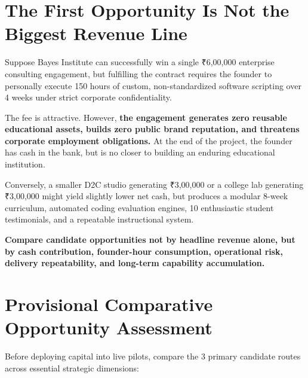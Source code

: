 \section{The First Opportunity Is Not the Biggest Revenue Line}

Suppose Bayes Institute can successfully win a single ₹6,00,000 enterprise consulting engagement, but fulfilling the contract requires the founder to personally execute 150 hours of custom, non-standardized software scripting over 4 weeks under strict corporate confidentiality.

The fee is attractive. However, \textbf{the engagement generates zero reusable educational assets, builds zero public brand reputation, and threatens corporate employment obligations.} At the end of the project, the founder has cash in the bank, but is no closer to building an enduring educational institution.

Conversely, a smaller D2C studio generating ₹3,00,000 or a college lab generating ₹3,00,000 might yield slightly lower net cash, but produces a modular 8-week curriculum, automated coding evaluation engines, 10 enthusiastic student testimonials, and a repeatable instructional system.

\textbf{Compare candidate opportunities not by headline revenue alone, but by cash contribution, founder-hour consumption, operational risk, delivery repeatability, and long-term capability accumulation.}

\section{Provisional Comparative Opportunity Assessment}

Before deploying capital into live pilots, compare the 3 primary candidate routes across essential strategic dimensions:


